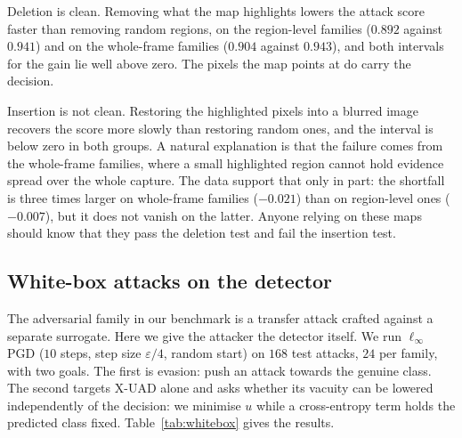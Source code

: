 \documentclass[conference]{IEEEtran}
\begin{document}
\begin{table}[t]
\centering
\caption{Faithfulness of the X-UAD localisation map against a smoothed random
control, protocol P1, $12$-epoch model. Insertion gain is map minus control; an
interval below zero means the map does worse than random.}
\label{tab:faith}
\footnotesize
\resizebox{\linewidth}{!}{}
\end{table}

Deletion is clean. Removing what the map highlights lowers the attack score
faster than removing random regions, on the region-level families ($0.892$ against
$0.941$) and on the whole-frame families ($0.904$ against $0.943$), and both
intervals for the gain lie well above zero. The pixels the map points at do carry
the decision.

Insertion is not clean. Restoring the highlighted pixels into a blurred image
recovers the score more slowly than restoring random ones, and the interval is
below zero in both groups. A natural explanation is that the failure comes from the
whole-frame families, where a small highlighted region cannot hold evidence spread
over the whole capture. The data support that only in part: the
shortfall is three times larger on whole-frame families ($-0.021$) than on
region-level ones ($-0.007$), but it does not vanish on the latter. Anyone relying
on these maps should know that they pass the deletion test and fail the insertion
test.

\subsection{White-box attacks on the detector}\label{sec:whitebox}
The adversarial family in our benchmark is a transfer attack crafted against a
separate surrogate. Here we give the attacker the detector itself. We run
$\ell_\infty$ PGD ($10$ steps, step size $\varepsilon/4$, random start) on $168$ test
attacks, $24$ per family, with two goals. The first is evasion: push an attack
towards the genuine class. The second targets X-UAD alone and asks whether its
vacuity can be lowered independently of the decision: we minimise $u$ while a
cross-entropy term holds the predicted class fixed. Table~\ref{tab:whitebox} gives
the results.

\begin{table}[t]
\centering
\caption{White-box PGD on $168$ test attacks, protocol P1, $12$-epoch models, at the
validation threshold. Upper rows: share of attacks still detected under evasion.
Lower rows: X-UAD's mean vacuity under the false-confidence attack, and how often
its predicted class is unchanged.}
\label{tab:whitebox}
\footnotesize
\resizebox{\linewidth}{!}{}
\end{table}
\end{document}
